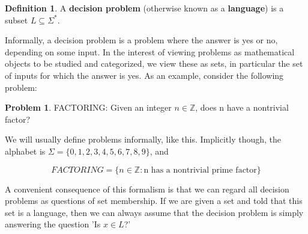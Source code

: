 \documentclass{article}
\theoremstyle{definition}
\newtheorem{definition}{Definition}[section]
\newtheorem{problem}{Problem}
\theoremstyle{plain}
\theoremstyle{theorem}
\begin{document}
\begin{definition}
A \textbf{decision problem} (otherwise known as a \textbf{language}) is a subset $L \subseteq \Sigma^*$.
\end{definition}

Informally, a decision problem is a problem where the answer is yes or no, depending on some input. In the interest of viewing problems as mathematical objects to be studied and categorized, we view these as sets, in particular the set of inputs for which the answer is yes. As an example, consider the following problem:

\begin{problem}
FACTORING: Given an integer $n \in \mathbb{Z}$, does n have a nontrivial factor?
\end{problem}

We will usually define problems informally, like this. Implicitly though, the alphabet is $\Sigma = \{0,1,2,3,4,5,6,7,8,9\}$, and

\[FACTORING = \{n\in\mathbb{Z}: \textrm{n has a nontrivial prime factor}\} \]

A convenient consequence of this formalism is that we can regard all decision problems as questions of set membership. If we are given a set and told that this set is a language, then we can always assume that the decision problem is simply answering the question 'Is $x\in L$?'
\end{document}
